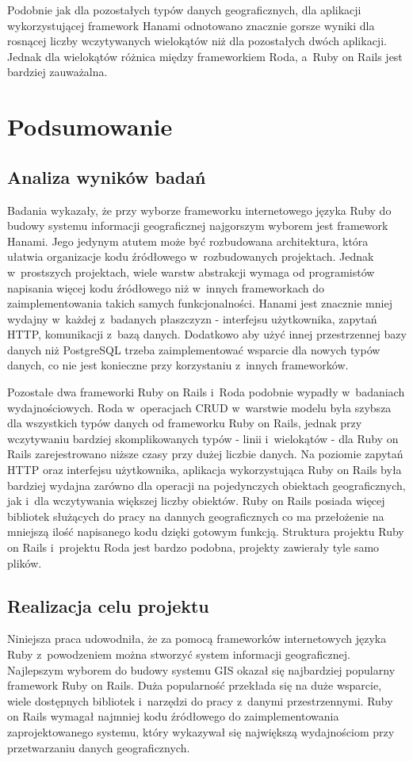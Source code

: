 \documentclass[archivemode]{mgr}
\begin{document}
Podobnie jak dla pozostałych typów danych geograficznych, dla aplikacji wykorzystującej framework Hanami odnotowano znacznie gorsze wyniki dla rosnącej liczby wczytywanych wielokątów niż dla pozostałych dwóch aplikacji. Jednak dla wielokątów różnica między frameworkiem Roda, a~Ruby on Rails jest bardziej zauważalna.

\chapter{Podsumowanie}
\section{Analiza wyników badań}

Badania wykazały, że przy wyborze frameworku internetowego języka Ruby do budowy systemu informacji geograficznej najgorszym wyborem jest framework Hanami. Jego jedynym atutem może być rozbudowana architektura, która ułatwia organizacje kodu źródłowego w~rozbudowanych projektach. Jednak w~prostszych projektach, wiele warstw abstrakcji wymaga od programistów napisania więcej kodu źródłowego niż w~innych frameworkach do zaimplementowania takich samych funkcjonalności. Hanami jest znacznie mniej wydajny w~każdej z~badanych płaszczyzn - interfejsu użytkownika, zapytań HTTP, komunikacji z~bazą danych. Dodatkowo aby użyć innej przestrzennej bazy danych niż PostgreSQL trzeba zaimplementować wsparcie dla nowych typów danych, co nie jest konieczne przy korzystaniu z~innych frameworków.

Pozostałe dwa frameworki Ruby on Rails i~Roda podobnie wypadły w~badaniach wydajnościowych. Roda w~operacjach CRUD w~warstwie modelu była szybsza dla wszystkich typów danych od frameworku Ruby on Rails, jednak przy wczytywaniu bardziej skomplikowanych typów - linii i~wielokątów - dla Ruby on Rails zarejestrowano niższe czasy przy dużej liczbie danych. Na poziomie zapytań HTTP oraz interfejsu użytkownika, aplikacja wykorzystująca Ruby on Rails była bardziej wydajna zarówno dla  operacji na pojedynczych obiektach geograficznych, jak i~dla wczytywania większej liczby obiektów. Ruby on Rails posiada więcej bibliotek służących do pracy na dannych geograficznych co ma przełożenie na mniejszą ilość napisanego kodu dzięki gotowym funkcją. Struktura projektu Ruby on Rails i~projektu Roda jest bardzo podobna, projekty zawierały tyle samo plików.

\section{Realizacja celu projektu}
Niniejsza praca udowodniła, że za pomocą frameworków internetowych języka Ruby z~powodzeniem można stworzyć system informacji geograficznej. Najlepszym wyborem do budowy systemu GIS okazał się najbardziej popularny framework Ruby on Rails. Duża popularność przekłada się na duże wsparcie, wiele dostępnych bibliotek i~narzędzi do pracy z~danymi przestrzennymi. Ruby on Rails wymagał najmniej kodu źródłowego do zaimplementowania zaprojektowanego systemu, który wykazywał się największą wydajnościom przy przetwarzaniu danych geograficznych.
  
\end{document}
